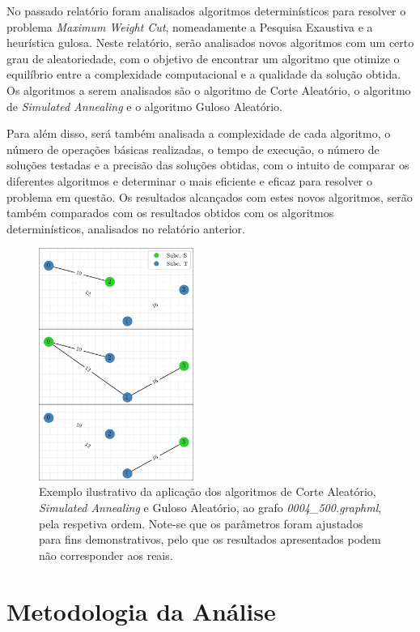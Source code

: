 \documentclass[mirror, portugues]{revdetua}
\begin{document}
No passado relatório foram analisados algoritmos determinísticos para resolver o problema \textit{Maximum Weight Cut}, nomeadamente a Pesquisa Exaustiva e a heurística gulosa. Neste relatório, serão analisados novos algoritmos com um certo grau de aleatoriedade, com o objetivo de encontrar um algoritmo que otimize o equilíbrio entre a complexidade computacional e a qualidade da solução obtida. Os algoritmos a serem analisados são o algoritmo de Corte Aleatório, o algoritmo de \textit{Simulated Annealing} e o algoritmo Guloso Aleatório.

Para além disso, será também analisada a complexidade de cada algoritmo, o número de operações básicas realizadas, o tempo de execução, o número de soluções testadas e a precisão das soluções obtidas, com o intuito de comparar os diferentes algoritmos e determinar o mais eficiente e eficaz para resolver o problema em questão. Os resultados alcançados com estes novos algoritmos, serão também comparados com os resultados obtidos com os algoritmos determinísticos, analisados no relatório anterior.

\begin{figure}[H]
    \centering
    \includegraphics[width=0.45\textwidth]{../assets/exampGraph.png}
    \caption{Exemplo ilustrativo da aplicação dos algoritmos de Corte Aleatório, \textit{Simulated Annealing} e Guloso Aleatório, ao grafo \textit{0004\_500.graphml}, pela respetiva ordem. Note-se que os parâmetros foram ajustados para fins demonstrativos, pelo que os resultados apresentados podem não corresponder aos reais.}
    \label{fig:exemplografos}
\end{figure}

\section{Metodologia da Análise}
\end{document}
